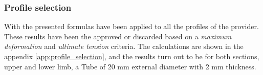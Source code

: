 \subsubsection{Profile selection} %
\label{ssub:profile_selection}
With the presented formulas have been applied to all the profiles of the provider.
These results have been the approved or discarded based on a \textit{maximum deformation} and \textit{ultimate tension} criteria.
The calculations are shown in the appendix \ref{app:profile_selection}, and the results turn out to be for both sections, upper and lower limb, a Tube of 20 mm external diameter with 2 mm thickness.




